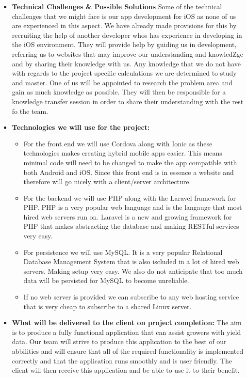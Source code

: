 \documentclass{article}
\begin{document}
\begin{itemize}
		\item \textbf{Technical Challenges \& Possible Solutions} \newline \newline
		Some of the technical challenges that we might face is our app development for iOS as none of us are experienced in this aspect. We have already made provisions for this by recruiting the help of another developer whos has experience in developing in the iOS environment. They will provide help by guiding us in development, referring us to websites that may improve our understanding and knowledZge and by sharing their knowledge with us. \newline
		Any knowledge that we do not have with regards to the project specific calculations we are determined to study and master. One of us will be appointed to research the problem area and gain as much knowledge as possible. They will then be responsible for a knowledge transfer session in order to share their understanding with the rest fo the team.
		\item \textbf{Technologies we will use for the project:}
			\begin{itemize}
				\item For the front end we will use Cordova along with Ionic as these technologies makes creating hybrid mobile apps easier. This means minimal code will need to be changed to make the app compatible with both Android and iOS. Since this front end is in essence a website and therefore will go nicely with a client/server architecture.
				\item For the backend we will use PHP along with the Laravel framework for PHP. PHP is a very popular web language and is the langauge that most hired web servers run on. Laravel is a new and growing framework for PHP that makes abstracting the database and making RESTful services very easy.
				\item For persistence we will use MySQL. It is a very popular Relational Database Management System that is also iscluded in a lot of hired web servers. Making setup very easy. We also do not anticipate that too much data will be persisted for MySQL to become unreliable.
				\item If no web server is provided we can subscribe to any web hosting service that is very cheap to subscribe to a shared Linux server.
			\end{itemize}
		\item \textbf{What will be delivered to the client on project completion:} \newline \newline
			The aim is to produce a fully functional application that can assist growers with yield data. Our team will strive to produce this application to the best of our abbilities and will ensure that all of the required functionality is implemented correctly and that the application runs smoothly and is user friendly. The client will then receive this application and be able to use it to their benefit.
	\end{itemize}
\end{document}
